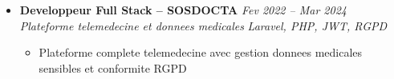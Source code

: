 \documentclass[a4paper,11pt]{article}
\begin{document}
\begin{itemize}[leftmargin=*, label={-}]
\item \textbf{Developpeur Full Stack -- SOSDOCTA} \hfill \textit{Fev 2022 -- Mar 2024} \\
\textit{Plateforme telemedecine et donnees medicales} \hfill \textit{Laravel, PHP, JWT, RGPD}
\vspace{-2pt}
    \begin{itemize}[leftmargin=0.4cm, nosep, label=\tiny$\bullet$]
        \item \small{Plateforme complete telemedecine avec gestion donnees medicales sensibles et conformite RGPD}
    \end{itemize}

\end{itemize}
\end{document}
